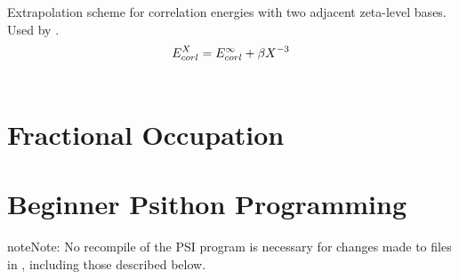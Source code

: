 \documentclass[letterpaper,10pt,english]{sphinxmanual}
\begin{document}

\begin{fulllineitems}
\label{index:wrappers.corl_xtpl_helgaker_2}
Extrapolation scheme for correlation energies with two adjacent zeta-level bases.
Used by {\hyperref[index:wrappers.complete_basis_set]{}}.
\begin{gather}
\begin{split}E_{corl}^X = E_{corl}^{\infty} + \beta X^{-3}\end{split}\notag\\\begin{split}\end{split}\notag
\end{gather}
\end{fulllineitems}



\chapter{Fractional Occupation}
\label{index:fractional-occupation}\label{index:module-frac}

\begin{fulllineitems}
\label{index:frac.frac_nuke}
\end{fulllineitems}


\begin{fulllineitems}
\label{index:frac.frac_traverse}
\end{fulllineitems}


\begin{fulllineitems}
\label{index:frac.ip_fitting}
\end{fulllineitems}



\chapter{Beginner Psithon Programming}
\label{index:beginner-psithon-programming}
\begin{notice}{note}{Note:}
No recompile of the PSI program is necessary for changes made to
files in , including those described below.
\end{notice}
\end{document}
